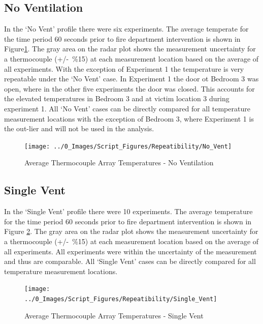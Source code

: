\documentclass[12pt,oneside]{book}
\begin{document}
\subsection{No Ventilation}
In the `No Vent' profile there were six experiments. The average temperate for the time period 60 seconds prior to fire department intervention is shown in Figure\ref{fig:repeat_No_Vent}. The gray area on the radar plot shows the measurement uncertainty for a thermocouple (+/-~\%15) at each measurement location based on the average of all experiments. With the exception of Experiment 1 the temperature is very repeatable under the `No Vent' case. In Experiment 1 the door ot Bedroom 3 was open, where in the other five experiments the door was closed. This accounts for the elevated temperatures in Bedroom 3 and at victim location 3 during experiment 1. All `No Vent' cases can be directly compared for all temperature measurement locations with the exception of Bedroom 3, where Experiment 1 is the out-lier and will not be used in the analysis. 

\begin{figure}[H]
\centering
\texttt{[image: ../0\_Images/Script\_Figures/Repeatibility/No\_Vent]}
\caption{Average Thermocouple Array Temperatures - No Ventilation}
\label{fig:repeat_No_Vent}
\end{figure}

\subsection{Single Vent}
In the `Single Vent' profile there were 10 experiments. The average temperature for the time period 60 seconds prior to fire department intervention is shown in Figure \ref{fig:repeat_Single_Vent}. The gray area on the radar plot shows the measurement uncertainty for a thermocouple (+/-~\%15) at each measurement location based on the average of all experiments. All experiments were within the uncertainty of the measurement and thus are comparable. All `Single Vent' cases can be directly compared for all temperature measurement locations. 

\begin{figure}[H]
\centering
\texttt{[image: ../0\_Images/Script\_Figures/Repeatibility/Single\_Vent]}
\caption{Average Thermocouple Array Temperatures - Single Vent}
\label{fig:repeat_Single_Vent}
\end{figure}
\end{document}
